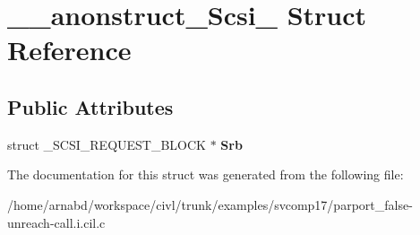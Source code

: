 \hypertarget{struct____anonstruct__Scsi__69}{}\section{\+\_\+\+\_\+anonstruct\+\_\+\+Scsi\+\_ Struct Reference}
\label{struct____anonstruct__Scsi__69}
\subsection*{Public Attributes}
\begin{DoxyCompactItemize}
\item 
\hypertarget{struct____anonstruct__Scsi__69_a2c7438682b29958dbb8950c66f39a4f5}{}struct \+\_\+\+S\+C\+S\+I\+\_\+\+R\+E\+Q\+U\+E\+S\+T\+\_\+\+B\+L\+O\+C\+K $\ast$ {\bfseries Srb}\label{struct____anonstruct__Scsi__69_a2c7438682b29958dbb8950c66f39a4f5}

\end{DoxyCompactItemize}


The documentation for this struct was generated from the following file\+:\begin{DoxyCompactItemize}
\item 
/home/arnabd/workspace/civl/trunk/examples/svcomp17/parport\+\_\+false-\/unreach-\/call.\+i.\+cil.\+c\end{DoxyCompactItemize}
